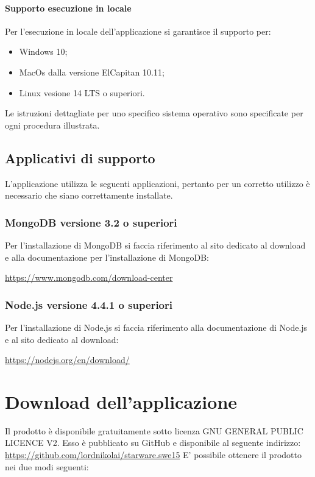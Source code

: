 \documentclass[12pt,a4paper]{article}
\begin{document}
	\paragraph{Supporto esecuzione in locale}
	Per l'esecuzione in locale  dell'applicazione si garantisce il supporto per:
		\begin{itemize}
			\item Windows 10;
			\item MacOs dalla versione ElCapitan 10.11;
			\item Linux vesione 14 LTS o superiori.
		\end{itemize}
	
	
	Le istruzioni dettagliate per uno specifico sistema operativo sono specificate per ogni procedura illustrata.
	
	\subsection{Applicativi di supporto}
	L'applicazione \prj utilizza le seguenti applicazioni, pertanto per un corretto utilizzo è necessario che siano correttamente installate.
	\subsubsection{MongoDB versione 3.2 o superiori}
	Per l'installazione di MongoDB si faccia riferimento al sito dedicato al download e alla documentazione per l'installazione di MongoDB:
	\begin{center} \url{https://www.mongodb.com/download-center}
	\end{center}
	
	\subsubsection{Node.js versione 4.4.1 o superiori}
		Per l'installazione di Node.js si faccia riferimento alla documentazione di Node.js e al sito dedicato al download:
		\begin{center} \url{https://nodejs.org/en/download/} 
		\end{center}
	
	\section{Download dell'applicazione}\label{download}
	Il prodotto è disponibile gratuitamente sotto  licenza GNU GENERAL PUBLIC LICENCE V2. Esso è pubblicato
	su GitHub e disponibile al seguente indirizzo: \url{https://github.com/lordnikolai/starware.swe15}
	E' possibile ottenere il prodotto nei due modi seguenti:
\end{document}
